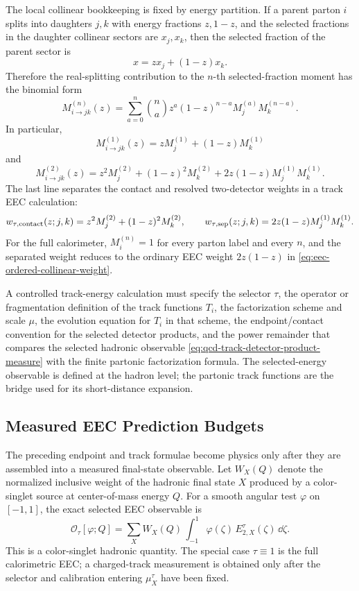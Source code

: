 The local collinear bookkeeping is fixed by energy partition.  If a parent
parton \(i\) splits into daughters \(j,k\) with energy fractions
\(z,1-z\), and the selected fractions in the daughter collinear sectors are
\(x_j,x_k\), then the selected fraction of the parent sector is
\[
  x=z x_j+(1-z)x_k .
\]
Therefore the real-splitting contribution to the \(n\)-th selected-fraction
moment has the binomial form
\begin{equation}
  M_{i\to jk}^{(n)}(z)
  =
  \sum_{a=0}^{n}
  \binom{n}{a}
  z^a(1-z)^{n-a}
  M_j^{(a)}M_k^{(n-a)} .
  \label{eq:qcd-track-function-binomial-moment}
\end{equation}
In particular,
\[
  M_{i\to jk}^{(1)}(z)=zM_j^{(1)}+(1-z)M_k^{(1)}
\]
and
\[
  M_{i\to jk}^{(2)}(z)
  =
  z^2M_j^{(2)}
  +(1-z)^2M_k^{(2)}
  +2z(1-z)M_j^{(1)}M_k^{(1)} .
\]
The last line separates the contact and resolved two-detector weights in a
track EEC calculation:
\begin{equation}
  w_{\tau,{\rm contact}}(z;j,k)
  =
  z^2M_j^{(2)}+(1-z)^2M_k^{(2)},\qquad
  w_{\tau,{\rm sep}}(z;j,k)
  =
  2z(1-z)M_j^{(1)}M_k^{(1)} .
  \label{eq:qcd-track-eec-contact-separated-weights}
\end{equation}
For the full calorimeter, \(M_i^{(n)}=1\) for every parton label and every
\(n\), and the separated weight reduces to the ordinary EEC weight
\(2z(1-z)\) in \eqref{eq:eec-ordered-collinear-weight}.

A controlled track-energy calculation must specify the selector \(\tau\), the
operator or fragmentation definition of the track functions \(T_i\), the
factorization scheme and scale \(\mu\), the evolution equation for \(T_i\) in
that scheme, the endpoint/contact convention for the selected detector
products, and the power remainder that compares the selected hadronic
observable \eqref{eq:qcd-track-detector-product-measure} with the finite
partonic factorization formula.  The selected-energy observable is defined at
the hadron level; the partonic track functions are the bridge used for its
short-distance expansion.

\subsection{Measured EEC Prediction Budgets}
\label{subsec:qcd-measured-eec-prediction-budgets}

The preceding endpoint and track formulae become physics only after they are
assembled into a measured final-state observable.  Let \(W_X(Q)\) denote the
normalized inclusive weight of the hadronic final state \(X\) produced by a
color-singlet source at center-of-mass energy \(Q\).  For a smooth angular
test \(\varphi\) on \([-1,1]\), the exact selected EEC observable is
\begin{equation}
  \mathcal O_\tau[\varphi;Q]
  =
  \sum_X W_X(Q)\,
  \int_{-1}^{1}
  \varphi(\zeta)\,E_{2,X}^{\tau}(\zeta)\,\dd\zeta .
  \label{eq:qcd-measured-selected-eec-observable}
\end{equation}
This is a color-singlet hadronic quantity.  The special case
\(\tau\equiv1\) is the full calorimetric EEC; a charged-track measurement is
obtained only after the selector and calibration entering
\(\mu_X^\tau\) have been fixed.

